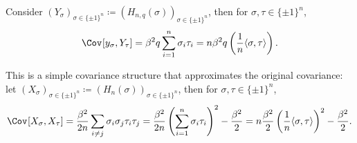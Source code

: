 Consider \((Y_\sigma )_{\sigma \in \{ \pm 1 \} ^n} \coloneqq (H_{n, q}(\sigma ))_{\sigma \in \{ \pm 1 \} ^n}\), then for \(\sigma , \tau \in \{ \pm 1 \} ^n\),
\[
	\Cov_{}[y_\sigma , Y_\tau ]
	= \beta ^2 q \sum_{i=1}^{n} \sigma _i \tau _i
	= n \beta ^2 q \left( \frac{1}{n} \langle \sigma , \tau \rangle \right) .
\]

\begin{intuition}
	This is a simple covariance structure that approximates the original covariance: let \((X_\sigma )_{\sigma \in \{ \pm 1 \} ^n} \coloneqq (H_n(\sigma ))_{\sigma \in \{ \pm 1 \} ^n}\), then for \(\sigma , \tau \in \{ \pm 1 \} ^n\),
	\[
		\Cov_{}[X_\sigma , X_\tau ]
		= \frac{\beta ^2}{2n} \sum_{i \neq j} \sigma _i \sigma _j \tau _i \tau _j
		= \frac{\beta ^2}{2n} \left( \sum_{i=1}^{n} \sigma _i \tau _i \right) ^2 - \frac{\beta ^2}{2}
		= n \frac{\beta ^2}{2} \left( \frac{1}{n} \langle \sigma , \tau \rangle \right) ^2 - \frac{\beta ^2}{2}.
	\]
\end{intuition}


